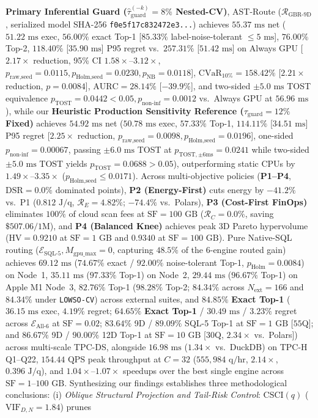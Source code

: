 \documentclass[10pt,a4paper]{article}
\begin{document}
\textbf{Primary Inferential Guard ($\hat{\tau}_{\text{guard}}^{(-k)}=8\%$ Nested-CV)}, AST-Route ($\mathcal{R}_{\text{GBR-9D}}$, serialized model SHA-256 \texttt{f0e5f17c832472e3...}) achieves $55.37\text{ ms}$ net ($51.22\text{ ms}$ exec, $56.00\%$ exact Top-1 [$85.33\%$ label-noise-tolerant $\le 5\text{ ms}$], $76.00\%$ Top-2, $118.40\%$ [$35.90\text{ ms}$] P95 regret vs.\ $257.31\%$ [$51.42\text{ ms}$] on Always GPU [$2.17\times$ reduction, 95\% CI $1.58\times\text{--}3.12\times$, $p_{\text{raw,seed}}=0.0115, p_{\text{Holm,seed}}=0.0230, p_{\text{NB}}=0.0118$], $\text{CVaR}_{10\%}=158.42\%$ [$2.21\times$ reduction, $p=0.0084$], $\text{AURC}=28.14\%$ [$-39.9\%$], and two-sided $\pm 5.0\text{ ms}$ TOST equivalence $p_{\text{TOST}}=0.0442 < 0.05, p_{\text{non-inf}}=0.0012$ vs.\ Always GPU at $56.96\text{ ms}$), while our \textbf{Heuristic Production Sensitivity Reference ($\tau_{\text{guard}}=12\%$ Fixed)} achieves $54.92\text{ ms}$ net ($50.78\text{ ms}$ exec, $57.33\%$ Top-1, $114.11\%$ [$34.51\text{ ms}$] P95 regret [$2.25\times$ reduction, $p_{\text{raw,seed}}=0.0098, p_{\text{Holm,seed}}=0.0196$], one-sided $p_{\text{non-inf}}=0.00067$, passing $\pm 6.0\text{ ms}$ TOST at $p_{\text{TOST},\pm 6\text{ms}}=0.0241$ while two-sided $\pm 5.0\text{ ms}$ TOST yields $p_{\text{TOST}}=0.0688 > 0.05$), outperforming static CPUs by $1.49\times\text{--}3.35\times$ ($p_{\text{Holm,seed}}\le 0.0171$). Across multi-objective policies (\textbf{P1--P4}, $\text{DSR}=0.0\%$ dominated points), \textbf{P2 (Energy-First)} cuts energy by $-41.2\%$ vs.\ P1 ($0.812\text{ J/q}$, $\mathcal{R}_E=4.82\%$; $-74.4\%$ vs.\ Polars), \textbf{P3 (Cost-First FinOps)} eliminates $100\%$ of cloud scan fees at $\text{SF}=100\text{ GB}$ ($\mathcal{R}_C=0.0\%$, saving $\$507.06/1\text{M}$), and \textbf{P4 (Balanced Knee)} achieves peak 3D Pareto hypervolume ($\text{HV}=0.9210$ at $\text{SF}=1\text{ GB}$ and $0.9340$ at $\text{SF}=100\text{ GB}$). Pure Native-SQL routing ($\mathcal{E}_{\text{SQL-5}}, M_{\text{gpu\_max}}=0$, capturing $48.5\%$ of the 6-engine routed gain) achieves $69.12\text{ ms}$ ($74.67\%$ exact / $92.00\%$ noise-tolerant Top-1, $p_{\text{Holm}}=0.0084$) on Node~1, $35.11\text{ ms}$ ($97.33\%$ Top-1) on Node~2, $29.44\text{ ms}$ ($96.67\%$ Top-1) on Apple M1 Node~3, $82.76\%$ Top-1 ($98.28\%$ Top-2; $84.34\%$ across $N_{\text{ext}}=166$ and $84.34\%$ under \texttt{LOWSO-CV}) across external suites, and $\mathbf{84.85\%}$ \textbf{Exact Top-1} ($36.15\text{ ms}$ exec, $4.19\%$ regret; $\mathbf{64.65\%}$ \textbf{Exact Top-1} / $30.49\text{ ms}$ / $3.23\%$ regret across $\mathcal{E}_{\text{All-6}}$ at $\text{SF}=0.02$; $83.64\%$ 9D / $89.09\%$ SQL-5 Top-1 at $\text{SF}=1\text{ GB}$ [$55$Q]; and $86.67\%$ 9D / $90.00\%$ 12D Top-1 at $\text{SF}=10\text{ GB}$ [$30$Q, $2.34\times$ vs.\ Polars]) across multi-scale TPC-DS, alongside $16.98\text{ ms}$ ($1.34\times$ vs.\ DuckDB) on TPC-H Q1--Q22, $154.44\text{ QPS}$ peak throughput at $C=32$ ($555{,}984\text{ q/hr}$, $2.14\times$, $0.396\text{ J/q}$), and $1.04\times\text{--}1.07\times$ speedups over the best single engine across $\text{SF}=1\text{--}100\text{ GB}$. Synthesizing our findings establishes three methodological conclusions: (i) \textit{Oblique Structural Projection and Tail-Risk Control}: $\text{CSCI}(q)$ ($\text{VIF}_{D,N}=1.84$) prunes 
\end{document}
